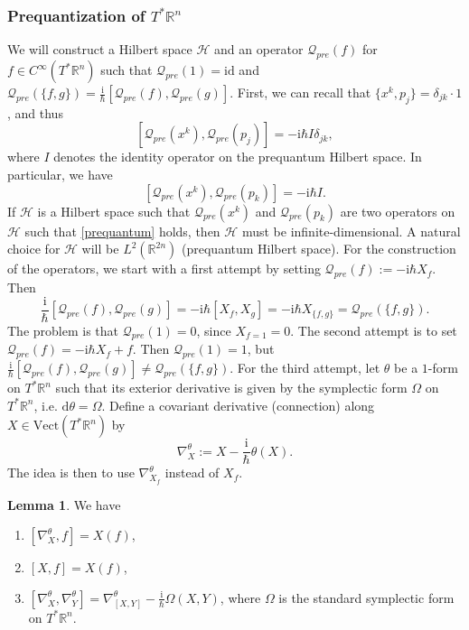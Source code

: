 \documentclass[12pt]{amsart}
\numberwithin{equation}{section}
\theoremstyle{plain}
\theoremstyle{definition}
\newtheorem{lem}{Lemma}[subsection]
\theoremstyle{remark}
\newcommand{\R}{\mathbb{R}}
\newcommand{\dd}{{\mathrm{d}}}
\newcommand{\id}{\mathrm{id}}
\newcommand{\calH}{\mathcal{H}}
\newcommand{\I}{\mathrm{i}}
\begin{document}
\subsubsection{Prequantization of $T^*\R^n$}
We will construct a Hilbert space $\calH$ and an operator $\mathscr{Q}_{pre}(f)$ for $f\in C^\infty(T^*\R^n)$ such that $\mathscr{Q}_{pre}(1)=\id$ and $\mathscr{Q}_{pre}(\{f,g\})=\frac{\I}{\hbar}[\mathscr{Q}_{pre}(f),\mathscr{Q}_{pre}(g)]$. First, we can recall that $\{ x^k,p_j\}=\delta_{jk}\cdot 1$, and thus $$[\mathscr{Q}_{pre}(x^k),\mathscr{Q}_{pre}(p_j)]=-\I\hbar I\delta_{jk},$$ 
where $I$ denotes the identity operator on the prequantum Hilbert space. In particular, we have
\begin{equation}
\label{prequantum}
[\mathscr{Q}_{pre}(x^k),\mathscr{Q}_{pre}(p_k)]=-\I\hbar I.
\end{equation}
If $\calH$ is a Hilbert space such that $\mathscr{Q}_{pre}(x^k)$ and $\mathscr{Q}_{pre}(p_k)$ are two operators on $\calH$ such that \eqref{prequantum} holds, then $\calH$ must be infinite-dimensional. A natural choice for $\calH$ will be $L^2(\R^{2n})$ (prequantum Hilbert space). For the construction of the operators, we start with a first attempt by setting $\mathscr{Q}_{pre}(f):=-\I\hbar X_f$. Then 
\[
\frac{\I}{\hbar}[\mathscr{Q}_{pre}(f),\mathscr{Q}_{pre}(g)]=-\I\hbar[X_f,X_g]=-\I\hbar X_{\{f,g\}}=\mathscr{Q}_{pre}(\{f,g\}).
\]
The problem is that $\mathscr{Q}_{pre}(1)=0$, since $X_{f=1}=0$. The second attempt is to set $\mathscr{Q}_{pre}(f)=-\I\hbar X_f+f$. Then $\mathscr{Q}_{pre}(1)=1$, but $\frac{\I}{\hbar}[\mathscr{Q}_{pre}(f),\mathscr{Q}_{pre}(g)]\not=\mathscr{Q}_{pre}(\{f,g\})$. For the third attempt, let $\theta$ be a $1$-form on $T^*\R^n$ such that its exterior derivative is given by the symplectic form $\Omega$ on $T^*\R^n$, i.e. $\dd\theta=\Omega$. Define a covariant derivative (connection) along $X\in \mathrm{Vect}(T^*\R^n)$ by $$\nabla_X^\theta:=X-\frac{\I}{\hbar}\theta(X).$$
The idea is then to use $\nabla_{X_f}^\theta$ instead of $X_f$. 
\begin{lem}
We have 
\begin{enumerate}
\item{$[\nabla_X^\theta,f]=X(f)$,}
\item{$[X,f]=X(f)$,}
\item{$[\nabla_X^\theta,\nabla_Y^\theta]=\nabla^\theta_{[X,Y]}-\frac{\I}{\hbar}\Omega(X,Y)$, where $\Omega$ is the standard symplectic form on $T^*\R^n$.
}
\end{enumerate}
\end{lem}
\end{document}
